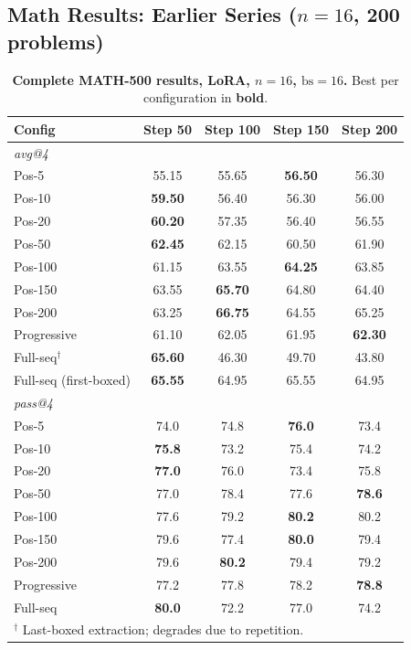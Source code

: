 \documentclass[10pt]{article}
\begin{document}
\subsection{Math Results: Earlier Series ($n{=}16$, 200 problems)}

\begin{table}[!htbp]
\centering
\caption{\textbf{Complete MATH-500 results, LoRA, $n{=}16$, $\text{bs}{=}16$.} Best per configuration in \textbf{bold}.}
\label{tab:app_math_n16}
\footnotesize
\begin{tabular}{lcccc}
\toprule
\textbf{Config} & \textbf{Step 50} & \textbf{Step 100} & \textbf{Step 150} & \textbf{Step 200} \\
\midrule
\multicolumn{5}{l}{\textit{avg@4}} \\
\midrule
Pos-5 & 55.15 & 55.65 & \textbf{56.50} & 56.30 \\
Pos-10 & \textbf{59.50} & 56.40 & 56.30 & 56.00 \\
Pos-20 & \textbf{60.20} & 57.35 & 56.40 & 56.55 \\
Pos-50 & \textbf{62.45} & 62.15 & 60.50 & 61.90 \\
Pos-100 & 61.15 & 63.55 & \textbf{64.25} & 63.85 \\
Pos-150 & 63.55 & \textbf{65.70} & 64.80 & 64.40 \\
Pos-200 & 63.25 & \textbf{66.75} & 64.55 & 65.25 \\
Progressive & 61.10 & 62.05 & 61.95 & \textbf{62.30} \\
Full-seq$^\dagger$ & \textbf{65.60} & 46.30 & 49.70 & 43.80 \\
Full-seq (first-boxed) & \textbf{65.55} & 64.95 & 65.55 & 64.95 \\
\midrule
\multicolumn{5}{l}{\textit{pass@4}} \\
\midrule
Pos-5 & 74.0 & 74.8 & \textbf{76.0} & 73.4 \\
Pos-10 & \textbf{75.8} & 73.2 & 75.4 & 74.2 \\
Pos-20 & \textbf{77.0} & 76.0 & 73.4 & 75.8 \\
Pos-50 & 77.0 & 78.4 & 77.6 & \textbf{78.6} \\
Pos-100 & 77.6 & 79.2 & \textbf{80.2} & 80.2 \\
Pos-150 & 79.6 & 77.4 & \textbf{80.0} & 79.4 \\
Pos-200 & 79.6 & \textbf{80.2} & 79.4 & 79.2 \\
Progressive & 77.2 & 77.8 & 78.2 & \textbf{78.8} \\
Full-seq & \textbf{80.0} & 72.2 & 77.0 & 74.2 \\
\bottomrule
\multicolumn{5}{l}{\footnotesize $^\dagger$ Last-boxed extraction; degrades due to repetition.}
\end{tabular}
\end{table}
\end{document}
